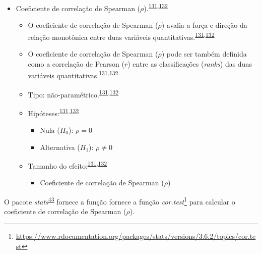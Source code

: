 \documentclass[
  a4paper,
]{book}
\providecommand{\tightlist}{%
  \setlength{\itemsep}{0pt}\setlength{\parskip}{0pt}}
\renewcommand{\href}[2]{#2\footnote{\url{#1}}}
\newenvironment{infobox}[1]
  {
  \begin{itemize}
  \renewcommand{\labelitemi}{
    \raisebox{-.7\height}[0pt][0pt]{
      {\setkeys{Gin}{width=3em,keepaspectratio}
        \texttt{[image: \#1]}}
    }
  }
  \setlength{\fboxsep}{1em}
  \begin{blackbox}
  \item
  }
  {
  \end{blackbox}
  \end{itemize}
  }
\begin{document}
\begin{itemize}
\item
  Coeficiente de correlação de Spearman (\(\rho\)).\textsuperscript{\protect\hyperlink{ref-khamis2008}{131},\protect\hyperlink{ref-allison2022}{132}}

  \begin{itemize}
  \item
    O coeficiente de correlação de Spearman (\(\rho\)) avalia a força e direção da relação monotônica entre duas variáveis quantitativas.\textsuperscript{\protect\hyperlink{ref-khamis2008}{131},\protect\hyperlink{ref-allison2022}{132}}
  \item
    O coeficiente de correlação de Spearman (\(\rho\)) pode ser também definida como a correlação de Pearson (\(r\)) entre as classificações (\emph{ranks}) das duas variáveis quantitativas.\textsuperscript{\protect\hyperlink{ref-khamis2008}{131},\protect\hyperlink{ref-allison2022}{132}}
  \item
    Tipo: não-paramétrico.\textsuperscript{\protect\hyperlink{ref-khamis2008}{131},\protect\hyperlink{ref-allison2022}{132}}
  \item
    Hipóteses:\textsuperscript{\protect\hyperlink{ref-khamis2008}{131},\protect\hyperlink{ref-allison2022}{132}}

    \begin{itemize}
    \item
      Nula (\(H_{0}\)): \(\rho=0\)
    \item
      Alternativa (\(H_{1}\)): \(\rho≠0\)
    \end{itemize}
  \item
    Tamanho do efeito:\textsuperscript{\protect\hyperlink{ref-khamis2008}{131},\protect\hyperlink{ref-allison2022}{132}}

    \begin{itemize}
    \tightlist
    \item
      Coeficiente de correlação de Spearman (\(\rho\))
    \end{itemize}
  \end{itemize}
\end{itemize}

\begin{infobox}{images/Rlogo}
O pacote \emph{stats}\textsuperscript{\protect\hyperlink{ref-stats-2}{43}} fornece a função fornece a função \href{https://www.rdocumentation.org/packages/stats/versions/3.6.2/topics/cor.test}{\emph{cor.test}} para calcular o coeficiente de correlação de Spearman (\(\rho\)).

\end{infobox}
\end{document}
